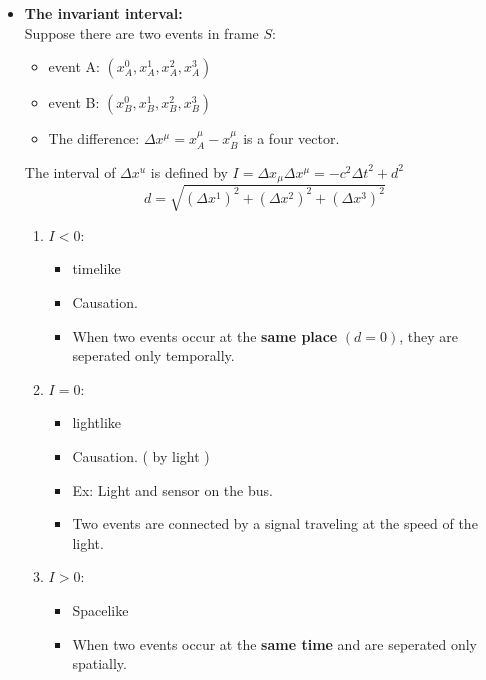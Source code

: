 \documentclass[fleqn,a4paper,12pt]{article}
\begin{document}
\begin{itemize}
\begin{itemize}
      \item 
        \textbf{The invariant interval:}\\
        Suppose there are two events in frame $S$:
        \begin{itemize}
          \item
            event A: $ ( x^0_A, x^1_A, x^2_A, x^3_A ) $
          \item 
            event B: $ ( x^0_B, x^1_B, x^2_B, x^3_B ) $
          \item 
            The difference: $ \Delta x^\mu = x^\mu_A - x^\mu_B $ is a four vector.                    
        \end{itemize}
        The interval of $ \Delta x^u $ is defined by $ I = \Delta x_\mu \Delta x^\mu = -c^2 {\Delta t}^2 + d^2 $
        \[ d = \sqrt{ (\Delta x^1 )^2 + (\Delta x^2 )^2 + (\Delta x^3 )^2  }\]
        \begin{enumerate}
          \item             
            $ I < 0 $:
            \begin{itemize}
              \item 
                timelike
              \item
                Causation.
              \item
                When two events occur at the \textbf{same place} $( d = 0 ) $, they are seperated only temporally.
            \end{itemize}
            
          \item
            $ I = 0 $:
            \begin{itemize}
            \item
              lightlike
            \item
              Causation. ( by light )
            \item
              Ex: Light and sensor on the bus.
            \item
              Two events are connected by a signal traveling at the speed of the light.
            \end{itemize}
            
          \item
            $ I > 0 $:
            \begin{itemize}
              \item
                Spacelike
              \item
                When two events occur at the \textbf{same time} and are seperated only spatially.
            \end{itemize} 
        \end{enumerate}


\end{itemize}
\end{itemize}
\end{document}

